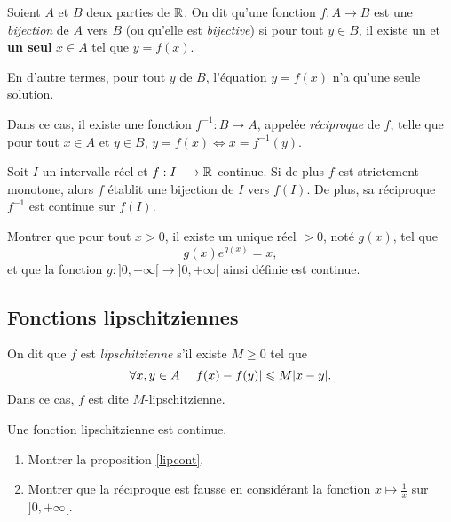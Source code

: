 \documentclass[../main.tex]{subfiles}
\begin{document}
\begin{mydef}
Soient $A$ et $B$ deux parties de $\mathbb R$. On dit qu'une fonction $f:A\longrightarrow B$ est une \textit{bijection} de $A$ vers $B$ (ou qu'elle est \textit{bijective}) si pour tout $y\in B$, il existe un et \textbf{un seul} $x\in A$ tel que $y=f(x)$.

En d'autre termes, pour tout $y$ de $B$, l'équation $y=f(x)$ n'a qu'une seule solution.

Dans ce cas, il existe une fonction $f^{-1}:B\longrightarrow A$, appelée \textit{réciproque} de $f$, telle que pour tout $x\in A$ et $y\in B$, $y=f(x) \Longleftrightarrow x = f^{-1}(y)$.
\end{mydef}

\begin{thm}
Soit $I$ un intervalle réel et $f:I\longrightarrow\mathbb R$ continue. Si de plus $f$ est strictement monotone, alors $f$ établit une bijection de $I$ vers $f(I)$. De plus, sa réciproque $f^{-1}$ est continue sur $f(I)$.
\end{thm}

\begin{exo}[M]
Montrer que pour tout $x>0$, il existe un unique réel $>0$, noté $g(x)$, tel que
\[
g(x)e^{g(x)} = x,
\]
et que la fonction $g:{]0,+\infty[}\longrightarrow{]0,+\infty[}$ ainsi définie est continue.
\end{exo}

\subsection{Fonctions lipschitziennes}

\begin{mydef}
    On dit que $f$ est \textit{lipschitzienne} s'il existe $M\geq 0$ tel que
    \[
    \forall x,y\in A\quad
    \lvert f(x)-f(y)\rvert\leqslant M\lvert x-y\rvert.
    \]
    Dans ce cas, $f$ est dite $M$-lipschitzienne.
\end{mydef}

\begin{prop}\label{lipcont}
    Une fonction lipschitzienne est continue.
\end{prop}

\begin{exo}[M]\begin{enumerate}
    \item Montrer la proposition \ref{lipcont}.
    \item Montrer que la réciproque est fausse en considérant la fonction $x\mapsto \frac{1}{x}$ sur $]0,+\infty[$.
\end{enumerate}
\end{exo}
\end{document}
